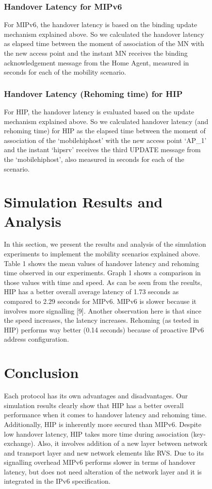 \documentclass{llncs}
\begin{document}
\begin{figure} [1]
\subsubsection{Handover Latency for MIPv6}
For MIPv6, the handover latency is based on the binding update mechanism explained above. So we calculated the handover latency as elapsed time between the moment of association of the MN with the new access point and the instant MN receives the binding acknowledgement message from the Home Agent, measured in seconds for each of the mobility scenario.

\subsubsection{Handover Latency (Rehoming time) for HIP}
For HIP, the handover latency is evaluated based on the update mechanism explained above. So we calculated handover latency (and rehoming time) for HIP as the elapsed time between the moment of association of the ‘mobilehiphost’ with the new access point ‘AP\_1’ and the instant ‘hipsrv’ receives the third UPDATE message from the ‘mobilehiphost’, also measured in seconds for each of the scenario.

\section{Simulation Results and Analysis}
In this section, we present the results and analysis of the simulation experiments to implement the mobility scenarios explained above. Table 1 shows the mean values of handover latency and rehoming time observed in our experiments. Graph 1 shows a comparison in those values with time and speed. As can be seen from the results, HIP has a better overall average latency of 1.73 seconds as compared to 2.29 seconds for MIPv6. MIPv6 is slower because it involves more signalling [9]. Another observation here is that since the speed increases, the latency increases. Rehoming (as tested in HIP) performs way better (0.14 seconds) because of proactive IPv6 address configuration.  

\section{Conclusion}
Each protocol has its own advantages and disadvantages. Our simulation results clearly show that HIP has a better overall performance when it comes to handover latency and rehoming time. Additionally, HIP is inherently more secured than MIPv6. Despite low handover latency, HIP takes more time during association (key-exchange). Also, it involves addition of a new layer between network and transport layer and new network elements like RVS. Due to its signalling overhead MIPv6 performs slower in terms of handover latency, but does not need alteration of the network layer and it is integrated in the IPv6 specification.


\end{figure}
\end{document}
